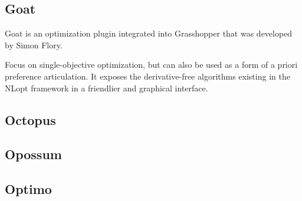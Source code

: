 \subsection{Goat}

Goat is an optimization plugin integrated into Grasshopper that was developed by Simon Flory. 

Focus on single-objective optimization, but can also be used as a form of a priori preference articulation. It exposes the derivative-free algorithms existing in the NLopt framework in a friendlier and graphical interface. 



\subsection{Octopus}
\subsection{Opossum}
\subsection{Optimo}